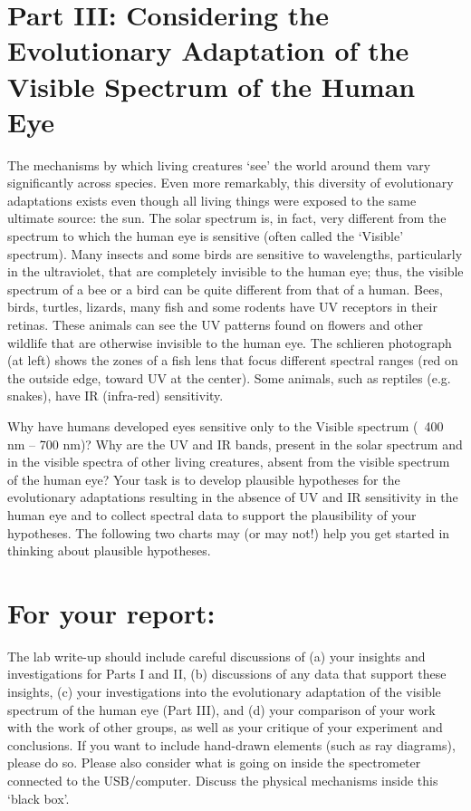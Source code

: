 \section*{Part III: Considering the Evolutionary Adaptation of the Visible Spectrum of the Human Eye}
The mechanisms by which living creatures `see' the world around them vary significantly across species. 
Even more remarkably, this diversity of evolutionary adaptations exists even though all living things were exposed to the same ultimate source: the sun. 
The solar spectrum is, in fact, very different from the spectrum to which the human eye is sensitive (often called the ‘Visible’ spectrum). 
Many insects and some birds are sensitive to wavelengths, particularly in the ultraviolet, that are completely invisible to the human eye; thus, the visible spectrum of a bee or a bird can be quite different from that of a human. 
Bees, birds, turtles, lizards, many fish and some rodents have UV receptors in their retinas. 
These animals can see the UV patterns found on flowers and other wildlife that are otherwise invisible to the human eye. 
The schlieren photograph (at left) shows the zones of a fish lens that focus different spectral ranges (red on the outside edge, toward UV at the center). 
Some animals, such as reptiles (e.g. snakes), have IR (infra-red) sensitivity. 
\par 
Why have humans developed eyes sensitive only to the Visible spectrum (~400 nm – 700 nm)? 
Why are the UV and IR bands, present in the solar spectrum and in the visible spectra of other living creatures, absent from the visible spectrum of the human eye? 
Your task is to develop plausible hypotheses for the evolutionary adaptations resulting in the absence of UV and IR sensitivity in the human eye and to collect spectral data to support the plausibility of your hypotheses. 
The following two charts may (or may not!) help you get started in thinking about plausible hypotheses.

\section*{For your report:}
The lab write-up should include careful discussions of (a) your insights and investigations for Parts I and II, (b) discussions of any data that support these insights, (c) your investigations into the evolutionary adaptation of the visible spectrum of the human eye (Part III), and (d) your comparison of your work with the work of other groups, as well as your critique of your experiment and conclusions. 
If you want to include hand-drawn elements (such as ray diagrams), please do so. 
Please also consider what is going on inside the spectrometer connected to the USB/computer. 
Discuss the physical mechanisms inside this `black box'.